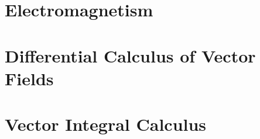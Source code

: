 \documentclass{report}
\begin{document}

\newpage


\newpage

\chapter{Electromagnetism}







\chapter{Differential Calculus of Vector Fields}









\chapter{Vector Integral Calculus}








\end{document}
